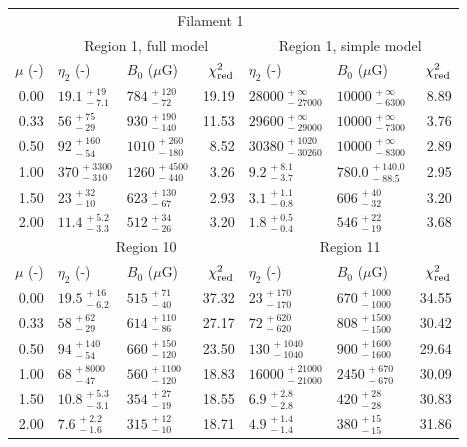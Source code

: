 \begin{tabular}{@{}rllr llr@{}}

\toprule
\multicolumn{6}{c}{Filament 1} \\
\cmidrule{1-7}
{} & \multicolumn{3}{c}{Region 1, full model\tablenotemark{a}}
   & \multicolumn{3}{c}{Region 1, simple model} \\
\cmidrule(lr){2-4} \cmidrule(l){5-7}
$\mu$ (-) & $\eta_2$ (-) & $B_0$ ($\mu$G) & $\chi^2_{\mathrm{red}}$
          & $\eta_2$ (-) & $B_0$ ($\mu$G) & $\chi^2_{\mathrm{red}}$ \\
\cmidrule{1-7}
0.00 & ${19.1}^{\,+19}_{\,-7.1}$ & ${784}^{\,+120}_{\,-72}$ & 19.19
     & ${28000}^{\,+\infty}_{\,-27000}$ & ${10000}^{\,+\infty}_{\,-6300}$ & 8.89 \\
0.33 & ${56}^{\,+75}_{\,-29}$ & $930^{\,+190}_{\,-140}$ & 11.53
     & ${29600}^{\,+\infty}_{\,-29000}$ & ${10000}^{\,+\infty}_{\,-7300}$ & 3.76 \\
0.50 & ${92}^{\,+160}_{\,-54}$ & ${1010}^{\,+260}_{\,-180}$ & 8.52
     & ${30380}^{\,+1020}_{\,-30260}$ & ${10000}^{\,+\infty}_{\,-8300}$ & 2.89 \\
1.00 & ${370}^{\,+3300}_{\,-310}$ & ${1260}^{\,+4500}_{\,-440}$ & 3.26
     & ${9.2}^{\,+8.1}_{\,-3.7}$ & ${780.0}^{\,+140.0}_{\,-88.5}$ & 2.95 \\
1.50 & ${23}^{\,+32}_{\,-10}$ & ${623}^{\,+130}_{\,-67}$ & 2.93
     & ${3.1}^{\,+1.1}_{\,-0.8}$ & ${606}^{\,+40}_{\,-32}$ & 3.20 \\
2.00 & ${11.4}^{\,+5.2}_{\,-3.3}$ & ${512}^{\,+34}_{\,-26}$ & 3.20
     & ${1.8}^{\,+0.5}_{\,-0.4}$ & ${546}^{\,+22}_{\,-19}$ & 3.68 \\

\cmidrule{1-7}
{} & \multicolumn{3}{c}{Region 10}
   & \multicolumn{3}{c}{Region 11\tablenotemark{b}} \\
\cmidrule(lr){2-4} \cmidrule(l){5-7}
$\mu$ (-) & $\eta_2$ (-) & $B_0$ ($\mu$G) & $\chi^2_{\mathrm{red}}$
          & $\eta_2$ (-) & $B_0$ ($\mu$G) & $\chi^2_{\mathrm{red}}$ \\
\cmidrule{1-7}
0.00 & ${19.5}^{\,+16}_{\,-6.2}$ & ${515}^{\,+71}_{\,-40}$      & 37.32
     & $23^{\,+170}_{\,-170}$ & $670^{\,+1000}_{\,-1000}$       & 34.55 \\
0.33 & ${58}^{\,+62}_{\,-29}$ & ${614}^{\,+110}_{\,-86}$        & 27.17
     & $72^{\,+620}_{\,-620}$ & $808^{\,+1500}_{\,-1500}$       & 30.42 \\
0.50 & ${94}^{\,+140}_{\,-54}$ & $660^{\,+150}_{\,-120}$        & 23.50
     & $130^{\,+1040}_{\,-1040}$ & $900^{\,+1600}_{\,-1600}$    & 29.64 \\
1.00 & ${68}^{\,+8000}_{\,-47}$ & $560^{\,+1100}_{\,-120}$      & 18.83
     & $16000^{\,+21000}_{\,-21000}$ & $2450^{\,+670}_{\,-670}$ & 30.09 \\
1.50 & ${10.8}^{\,+5.3}_{\,-3.1}$ & ${354}^{\,+27}_{\,-19}$     & 18.55
     & ${6.9}^{\,+2.8}_{\,-2.8}$ & ${420}^{\,+28}_{\,-28}$      & 30.83 \\
2.00 & ${7.6}^{\,+2.2}_{\,-1.6}$ & ${315}^{\,+12}_{\,-10}$      & 18.71
     & ${4.9}^{\,+1.4}_{\,-1.4}$ & ${380}^{\,+15}_{\,-15}$      & 31.86 \\


\end{tabular}
